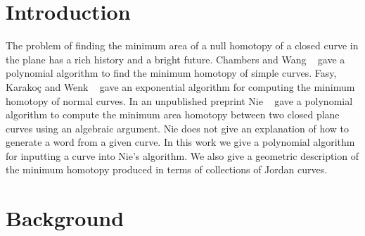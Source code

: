 \documentclass[11pt]{article}
\begin{document}
\maketitle



\section{Introduction}
\todo{}

The problem of finding the minimum area of a null homotopy of a closed curve in the plane has a rich history and a bright future. Chambers and Wang ~\cite{cw2013} gave a polynomial algorithm to find the minimum homotopy of simple curves. Fasy, Karako\c{c} and Wenk ~\cite{fkw2017} gave an exponential algorithm for computing the minimum homotopy of normal curves. In an unpublished preprint Nie ~\cite{nie2014} gave a polynomial algorithm to compute the minimum area homotopy between two closed plane curves using an algebraic argument. Nie does not give an explanation of how to generate a word from a given curve. In this work we give a polynomial algorithm for inputting a curve into Nie's algorithm. We also give a geometric description of the minimum homotopy produced in terms of collections of Jordan curves. 





\section{Background}
\end{document}
